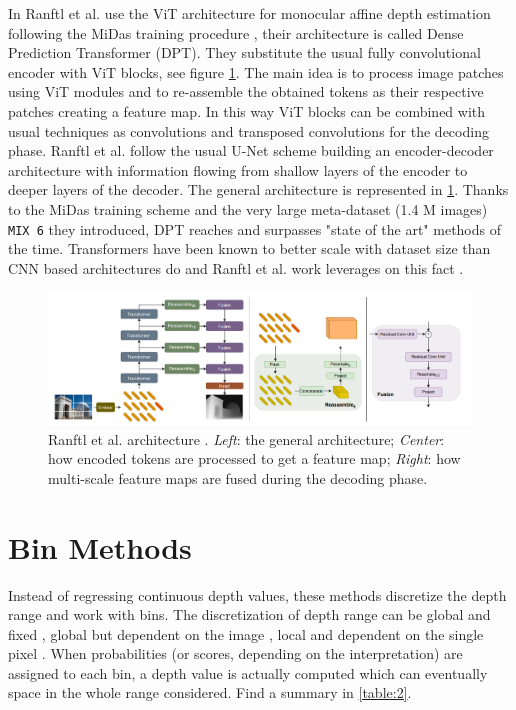 In \cite{denseViT} Ranftl et al. use the ViT \cite{ViT} architecture for monocular affine depth estimation following the MiDas training procedure \cite{MiDas}, their architecture is called Dense Prediction Transformer (DPT).
They substitute the usual fully convolutional encoder with ViT blocks, see figure \ref{fig:denseViT_architecture}.
The main idea is to process image patches using ViT modules and to re-assemble the obtained tokens as their respective patches creating a feature map.
In this way ViT blocks can be combined with usual techniques as convolutions and transposed convolutions for the decoding phase.
Ranftl et al. follow the usual U-Net \cite{UNet} scheme building an encoder-decoder architecture with information flowing from shallow layers of the encoder to deeper layers of the decoder.
The general architecture is represented in \ref{fig:denseViT_architecture}.
Thanks to the MiDas \cite{MiDas} training scheme and the very large meta-dataset (1.4 M images) \texttt{MIX 6} they introduced, DPT reaches and surpasses "state of the art" methods of the time.
Transformers have been known to better scale with dataset size than CNN based architectures do and Ranftl et al. work leverages on this fact \cite{ViT}.

\begin{figure}
\centering
\includegraphics[scale=0.3]{figs/denseViT_architecture}
\caption{Ranftl et al. architecture \cite{denseViT}. \textit{Left}: the general architecture; \textit{Center}: how encoded tokens are processed to get a feature map; \textit{Right}: how multi-scale feature maps are fused during the decoding phase. \label{fig:denseViT_architecture}}
\end{figure}

\newpage
\section{Bin Methods}
Instead of regressing continuous depth values, these methods discretize the depth range and work with bins.
The discretization of depth range can be global and fixed \cite{depth_as_classification, ordinal_regression}, global but dependent on the image \cite{AdaBins}, local and dependent on the single pixel \cite{ZoeDepth}.
When probabilities (or scores, depending on the interpretation) are assigned to each bin, a depth value is actually computed which can eventually space in the whole range considered.
Find a summary in \ref{table:2}.

